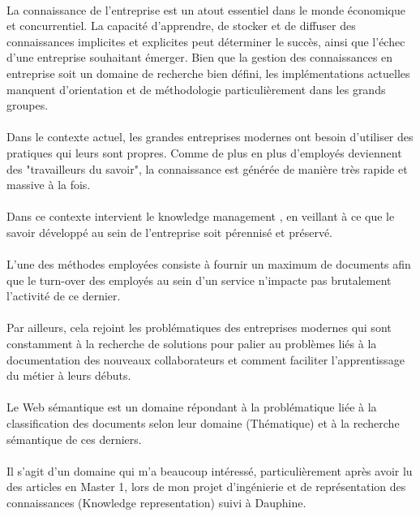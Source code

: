 \documentclass[12pt, a4paper, oneside]{book}
\begin{document}
\paragraph{}
La connaissance de l'entreprise est un atout essentiel dans le monde économique et concurrentiel.
La capacité d'apprendre, de stocker et de diffuser des connaissances implicites et explicites peut déterminer le succès, ainsi que l'échec d'une entreprise souhaitant émerger. Bien que la gestion des connaissances en entreprise soit un domaine de recherche bien défini, les implémentations actuelles manquent d'orientation et  de méthodologie particulièrement dans les grands groupes.
\paragraph{}
Dans le contexte actuel, les grandes entreprises modernes ont besoin d'utiliser des pratiques qui leurs sont propres.
Comme de plus en plus d'employés deviennent des "travailleurs du savoir",
la connaissance est générée de manière très rapide et massive à la fois.
\paragraph{}
Dans ce contexte intervient le knowledge management , en veillant à ce que le savoir développé au sein de l'entreprise soit pérennisé et préservé.
\paragraph{}
L'une des méthodes employées consiste à fournir un maximum de documents afin que le turn-over des employés au sein d'un service n'impacte pas brutalement l'activité de ce dernier.
\paragraph{}
Par ailleurs, cela rejoint les problématiques des entreprises modernes qui sont constamment à la recherche de solutions pour palier au problèmes liés à la documentation des nouveaux collaborateurs et comment faciliter l'apprentissage du métier à leurs débuts.
\paragraph{}
Le Web sémantique est un domaine répondant à la problématique liée à la classification des documents selon leur domaine (Thématique) et à la recherche sémantique de ces derniers.
\paragraph{}
Il s'agit d'un domaine qui m'a beaucoup intéressé, particulièrement après avoir lu des articles en Master 1, lors de mon projet d'ingénierie et de représentation des connaissances (Knowledge representation) suivi à Dauphine.
\end{document}
